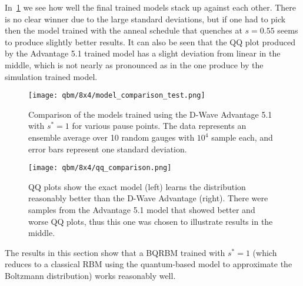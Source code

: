 In~\cref{fig:model_comparison_test} we see how well the final trained models stack up against each other.
There is no clear winner due to the large standard deviations, but if one had to pick then the model trained with the anneal schedule that quenches at \( s = 0.55 \) seems to produce slightly better results.
It can also be seen that the QQ plot produced by the Advantage 5.1 trained model has a slight deviation from linear in the middle, which is not nearly as pronounced as in the one produce by the simulation trained model.
\begin{figure}[!htb]
    \begin{center}
        \texttt{[image: qbm/8x4/model\_comparison\_test.png]}
    \end{center}
    \caption{Comparison of the models trained using the D-Wave Advantage 5.1 with \( s^* = 1 \) for various pause points. The data represents an ensemble average over 10 random gauges with \( 10^4 \) sample each, and error bars represent one standard deviation.}
    \label{fig:model_comparison_test}
\end{figure}
\begin{figure}[!htb]
    \begin{center}
        \texttt{[image: qbm/8x4/qq\_comparison.png]}
    \end{center}
    \caption{QQ plots show the exact model (left) learns the distribution reasonably better than the D-Wave Advantage (right). There were samples from the Advantage 5.1 model that showed better and worse QQ plots, thus this one was chosen to illustrate results in the middle.}
    \label{fig:qq_comparison}
\end{figure}

The results in this section show that a BQRBM trained with \( s^* = 1 \) (which reduces to a classical RBM using the quantum-based model to approximate the Boltzmann distribution) works reasonably well.
